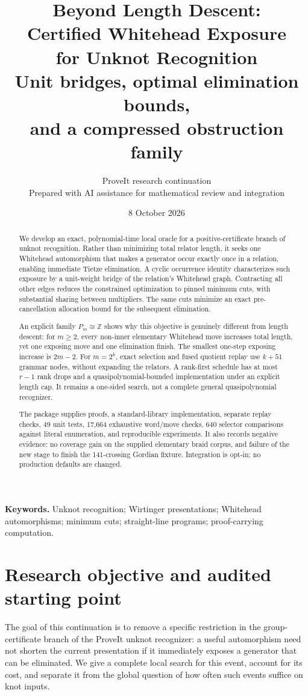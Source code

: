 \documentclass[11pt,letterpaper]{article}
\title{\textbf{Beyond Length Descent:}\\[3pt]
Certified Whitehead Exposure\\for Unknot Recognition\\[7pt]
\large Unit bridges, optimal elimination bounds,\\and a compressed obstruction family}
\author{ProveIt research continuation\\\small Prepared with AI assistance for mathematical review and integration}
\date{8 October 2026}
\theoremstyle{definition}\newtheorem{definition}[theorem]{Definition}
\newcommand{\Z}{\mathbb Z}
\begin{document}
\maketitle
\begin{abstract}
We develop an exact, polynomial-time local oracle for a positive-certificate branch of unknot recognition. Rather than minimizing total relator length, it seeks one Whitehead automorphism that makes a generator occur exactly once in a relation, enabling immediate Tietze elimination. A cyclic occurrence identity characterizes such exposure by a unit-weight bridge of the relation's Whitehead graph. Contracting all other edges reduces the constrained optimization to pinned minimum cuts, with substantial sharing between multipliers. The same cuts minimize an exact pre-cancellation allocation bound for the subsequent elimination.

An explicit family $P_m\cong\Z$ shows why this objective is genuinely different from length descent: for $m\ge2$, every non-inner elementary Whitehead move increases total length, yet one exposing move and one elimination finish. The smallest one-step exposing increase is $2m-2$. For $m=2^k$, exact selection and fused quotient replay use $k+51$ grammar nodes, without expanding the relators. A rank-first schedule has at most $r-1$ rank drops and a quasipolynomial-bounded implementation under an explicit length cap. It remains a one-sided search, not a complete general quasipolynomial recognizer.

The package supplies proofs, a standard-library implementation, separate replay checks, 49 unit tests, 17,664 exhaustive word/move checks, 640 selector comparisons against literal enumeration, and reproducible experiments. It also records negative evidence: no coverage gain on the supplied elementary braid corpus, and failure of the new stage to finish the 141-crossing Gordian fixture. Integration is opt-in; no production defaults are changed.
\end{abstract}
\vspace{3pt}
\noindent\textbf{Keywords.} Unknot recognition; Wirtinger presentations; Whitehead automorphisms; minimum cuts; straight-line programs; proof-carrying computation.
\newpage
\tableofcontents
\newpage

\section{Research objective and audited starting point}\label{sec:scope}
The goal of this continuation is to remove a specific restriction in the group-certificate branch of the ProveIt unknot recognizer: a useful automorphism need not shorten the current presentation if it immediately exposes a generator that can be eliminated. We give a complete local search for this event, account for its cost, and separate it from the global question of how often such events suffice on knot inputs.
\end{document}
